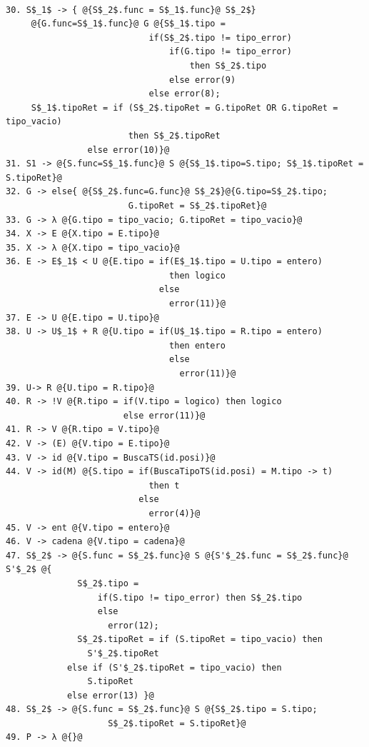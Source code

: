 \begin{lstlisting}[style=EdT]
                     
30. S$_1$ -> { @{S$_2$.func = S$_1$.func}@ S$_2$}
     @{G.func=S$_1$.func}@ G @{S$_1$.tipo =
                            if(S$_2$.tipo != tipo_error)
                                if(G.tipo != tipo_error)
                                    then S$_2$.tipo
                                else error(9)
                            else error(8);
     S$_1$.tipoRet = if (S$_2$.tipoRet = G.tipoRet OR G.tipoRet = tipo_vacio)
						then S$_2$.tipoRet
				else error(10)}@
31. S1 -> @{S.func=S$_1$.func}@ S @{S$_1$.tipo=S.tipo; S$_1$.tipoRet = S.tipoRet}@
32. G -> else{ @{S$_2$.func=G.func}@ S$_2$}@{G.tipo=S$_2$.tipo; 
						G.tipoRet = S$_2$.tipoRet}@
33. G -> λ @{G.tipo = tipo_vacio; G.tipoRet = tipo_vacio}@
34. X -> E @{X.tipo = E.tipo}@
35. X -> λ @{X.tipo = tipo_vacio}@
36. E -> E$_1$ < U @{E.tipo = if(E$_1$.tipo = U.tipo = entero)
                                then logico
                              else
                                error(11)}@
37. E -> U @{E.tipo = U.tipo}@
38. U -> U$_1$ + R @{U.tipo = if(U$_1$.tipo = R.tipo = entero)
                                then entero
                                else
                                  error(11)}@
39. U-> R @{U.tipo = R.tipo}@
40. R -> !V @{R.tipo = if(V.tipo = logico) then logico
                       else error(11)}@
41. R -> V @{R.tipo = V.tipo}@
42. V -> (E) @{V.tipo = E.tipo}@
43. V -> id @{V.tipo = BuscaTS(id.posi)}@
44. V -> id(M) @{S.tipo = if(BuscaTipoTS(id.posi) = M.tipo -> t)
                            then t
                          else
                            error(4)}@
45. V -> ent @{V.tipo = entero}@
46. V -> cadena @{V.tipo = cadena}@
47. S$_2$ -> @{S.func = S$_2$.func}@ S @{S'$_2$.func = S$_2$.func}@ S'$_2$ @{
              S$_2$.tipo =
                  if(S.tipo != tipo_error) then S$_2$.tipo
                  else
                    error(12);
              S$_2$.tipoRet = if (S.tipoRet = tipo_vacio) then 
				S'$_2$.tipoRet
			else if (S'$_2$.tipoRet = tipo_vacio) then
				S.tipoRet
			else error(13) }@
48. S$_2$ -> @{S.func = S$_2$.func}@ S @{S$_2$.tipo = S.tipo; 
					S$_2$.tipoRet = S.tipoRet}@
49. P -> λ @{}@
\end{lstlisting}
\newpage
